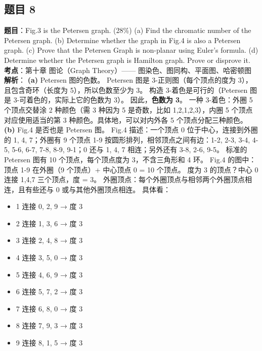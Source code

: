 \documentclass[10pt,a4paper,openany]{ctexbook}
\theoremstyle{definition}
\theoremstyle{remark}
\begin{document}
\subsection{题目 8}

\textbf{题目}：Fig.3 is the Petersen graph. (28\%)
(a) Find the chromatic number of the Petersen graph.
(b) Determine whether the graph in Fig.4 is also a Petersen graph.
(c) Prove that the Petersen Graph is non-planar using Euler's formula.
(d) Determine whether the Petersen graph is Hamilton graph. Prove or disprove it.
\textbf{考点}：第十章 图论（Graph Theory）—— 图染色、图同构、平面图、哈密顿图
\textbf{解析}：
\textbf{(a)} Petersen 图的色数。
Petersen 图是 3-正则图（每个顶点的度为 3），且包含奇环（长度为 5），所以色数至少为 3。
构造 3-着色是可行的（Petersen 图是 3-可着色的，实际上它的色数为 3）。
因此，\textbf{色数为 3}。
一种 3-着色：外圈 5 个顶点交替涂 2 种颜色（需 3 种因为 5 是奇数，比如 1,2,1,2,3），内圈 5 个顶点对应使用适当的第 3 种颜色。具体地，可以对内外各 5 个顶点分配三种颜色。
\textbf{(b)} Fig.4 是否也是 Petersen 图。
Fig.4 描述：一个顶点 0 位于中心，连接到外圈的 1, 4, 7；外圈有 9 个顶点 1-9 按圆形排列，相邻顶点之间有边：1-2, 2-3, 3-4, 4-5, 5-6, 6-7, 7-8, 8-9, 9-1；0 还与 1, 4, 7 相连；另外还有 3-8, 2-6, 9-5。
标准的 Petersen 图有 10 个顶点，每个顶点度为 3，不含三角形和 4 环。
Fig.4 的图中：顶点 1-9 在外圈（9 个顶点）+ 中心顶点 0 = 10 个顶点。
度为 3 的顶点？中心 0 连接 1,4,7 三个顶点，度 = 3。
外圈顶点：每个外圈顶点与相邻两个外圈顶点相连，且有些还与 0 或与其他外圈顶点相连。
具体看：
\begin{itemize}
\item 1 连接 0, 2, 9 → 度 3
\item 2 连接 1, 3, 6 → 度 3
\item 3 连接 2, 4, 8 → 度 3
\item 4 连接 3, 5, 0 → 度 3
\item 5 连接 4, 6, 9 → 度 3
\item 6 连接 5, 7, 2 → 度 3
\item 7 连接 6, 8, 0 → 度 3
\item 8 连接 7, 9, 3 → 度 3
\item 9 连接 8, 1, 5 → 度 3

\end{itemize}
\end{document}
